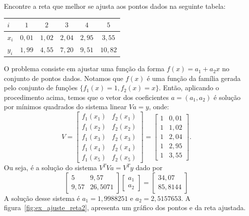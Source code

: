 \begin{ex}\label{ex:ajuste_reta2} Encontre a reta que melhor se ajusta aos pontos dados na seguinte tabela:
  \begin{center}
    \begin{tabular}{l|ccccc}
      $i$ & $1$   & $2$  & $3$ & $4$ & $5$\\\hline
      $x_i$& $0,01$ & $1,02$ & $2,04$ & $2,95$ & $3,55$\\
      $y_i$ & $1,99$ & $4,55$ & $7,20$ & $9,51$ & $10,82$
    \end{tabular}
  \end{center}
\end{ex}
\begin{sol}
O problema consiste em ajustar uma função da forma $f(x) = a_1 + a_2x$ no conjunto de pontos dados. Notamos que $f(x)$ é uma função da família gerada pelo conjunto de funções $\{f_1(x) = 1, f_2(x) = x\}$. Então, aplicando o procedimento acima, temos que o vetor dos coeficientes $a = (a_1, a_2)$ é solução por mínimos quadrados do sistema linear $Va = y$, onde:
\begin{equation*}
  V = \begin{bmatrix}
    f_1(x_1) & f_2(x_1)\\
    f_1(x_2) & f_2(x_2)\\
    f_1(x_3) & f_2(x_3)\\
    f_1(x_4) & f_2(x_4)\\
    f_1(x_5) & f_2(x_5)
  \end{bmatrix}
= \begin{bmatrix}
    1 &0,01\\
    1 &1,02\\
    1 &2,04\\
    1 &2,95\\
    1 &3,55
\end{bmatrix}.
\end{equation*}
Ou seja, é a solução do sistema $V^TVa = V^Ty$ dado por
\begin{equation*}
  \begin{bmatrix}
    5     & 9,57 \\
    9,57  & 26,5071
  \end{bmatrix}
  \begin{bmatrix}
    a_1   \\
    a_2
  \end{bmatrix}=
  \begin{bmatrix}
    34,07  \\
    85,8144
  \end{bmatrix}
\end{equation*}
A solução desse sistema é $a_1 = 1,9988251$ e $a_2 = 2,5157653$. A figura~\ref{fig:ex_ajuste_reta2}, apresenta um gráfico dos pontos e da reta ajustada.


\end{sol}

